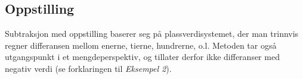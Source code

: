 \subsection{Oppstilling}
Subtraksjon med oppstilling baserer seg på plassverdisystemet, der man trinnvis regner differansen mellom enerne, tierne, hundrerne, o.l. Metoden tar også utgangspunkt i et mengdeperspektiv, og tillater derfor ikke differanser med negativ verdi (se forklaringen til \textsl{Eksempel 2}).
\begin{center}
	\parbox{0.3\linewidth}{
} \qquad
\parbox{0.3\linewidth}{
} \\[12pt]
\parbox{0.3\linewidth}{
}\qquad
\parbox{0.3\linewidth}{
}

\end{center}
